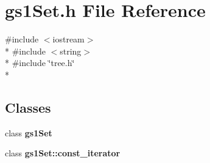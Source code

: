 \section{gs1\+Set.\+h File Reference}
\label{gs1_set_8h}
{\ttfamily \#include $<$iostream$>$}\\*
{\ttfamily \#include $<$string$>$}\\*
{\ttfamily \#include \char`\"{}tree.\+h\char`\"{}}\\*
\subsection*{Classes}
\begin{DoxyCompactItemize}
\item 
class {\bf gs1\+Set}
\item 
class {\bf gs1\+Set\+::const\+\_\+iterator}
\end{DoxyCompactItemize}
